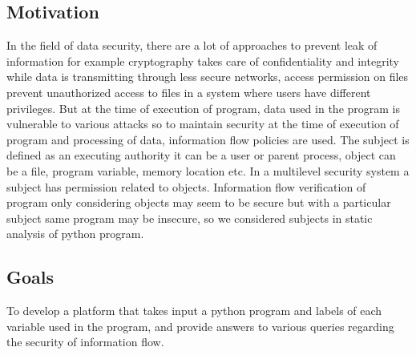 \subsection{Motivation}
In the field of data security, there are a lot of approaches to prevent leak of information for example cryptography takes care of confidentiality and integrity while data is transmitting through less secure networks, access permission on files prevent unauthorized access to files in a system where users have different privileges. But at the time of execution of program, data used in the program is vulnerable to various attacks so to maintain security at the time of execution of program and processing of data, information flow policies are used. The subject is defined as an executing authority it can be a user or parent process, object can be a file, program variable, memory location etc. In a multilevel security system a subject has permission related to objects. Information flow verification of program only considering objects may seem to be secure but with a particular subject same program may be insecure, so we considered subjects in static analysis of python program.   

\subsection{Goals}
To develop a platform that takes input a python program and labels of each variable used in the program, and provide answers to various queries regarding the security of information flow.   
